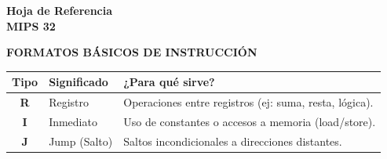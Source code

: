 \documentclass[10pt]{article}
\begin{document}
\begin{center}
    \vspace*{1.5cm} 
    \huge \textbf{Hoja de Referencia} \\[0.3cm]
    \Large \textbf{MIPS 32}
    \vspace{1.2cm} 

    {\large \textbf{FORMATOS BÁSICOS DE INSTRUCCIÓN}}
    \vspace{0.3cm}

    \normalsize 
    \setlength{\tabcolsep}{10pt} 
    \renewcommand{\arraystretch}{1.3} 

    \begin{tabular}{|c|l|l|}
    \hline
    \textbf{Tipo} & \textbf{Significado} & \textbf{¿Para qué sirve?} \\ \hline
    \textbf{R} & Registro & Operaciones entre registros (ej: suma, resta, lógica). \\ \hline
    \textbf{I} & Inmediato & Uso de constantes o accesos a memoria (load/store). \\ \hline
    \textbf{J} & Jump (Salto) & Saltos incondicionales a direcciones distantes. \\ \hline
    \end{tabular}
\end{center}

\vspace{0.6cm} 
\end{document}

